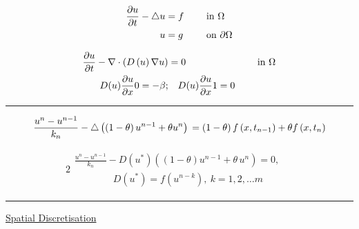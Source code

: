 \documentclass[a4paper]{article}
\begin{document}
\begin{landscape}
    \large
    \centering
    \begin{minipage}{0.480\columnwidth}
        \begin{alignat}{2}
            \diffp{u}{t} - \triangle u & = f  &\quad& \text{ in } \Omega \\
            u & = g  &\quad& \text{ on } \partial\Omega
        \end{alignat}
    \end{minipage}
    \hfill
    \begin{minipage}{0.480\columnwidth}
        \begin{alignat}{2}
            \diffp{u}{t} - \nabla \cdot \left(D\left(u\right) \nabla u\right) & = 0  &\quad& \text{ in } \Omega  \\
            D(u) \diffp{u}{x}{0} = -\beta; & \quad   D(u) \diffp{u}{x}{1} = 0
        \end{alignat}
    \end{minipage}

    \bigskip
    \noindent\rule{\columnwidth}{1pt}

    \begin{minipage}{0.4800\columnwidth}
        \begin{equation}
            \frac{u^n - u^{n-1}}{k_n} - \triangle \left(\left(1-\theta\right)u^{n-1} + \theta u^n\right) \\ = \left(1-\theta\right)f\left(x,t_{n-1}\right) + \theta f\left(x,t_n\right)
        \end{equation}
    \end{minipage}
    \hfill
    \begin{minipage}{0.4800\columnwidth}
        \begin{alignat}{2}
            \begin{multlined}
                \frac{u^n - u^{n-1}}{k_n} - D\left(u^\ast\right) \left(\left(1-\theta\right)u^{n-1} + \theta\, u^n\right) = 0, \quad  \\
                \qquad\qquad D\left(u^\ast\right) = f(u^{n-k}), \ k = 1,2,\dots m
            \end{multlined}
        \end{alignat}
    \end{minipage}

    \bigskip
    \noindent\rule{\columnwidth}{1pt}

    \begin{flushleft}
        \underline{Spatial Discretisation}


\end{flushleft}
\end{landscape}
\end{document}
